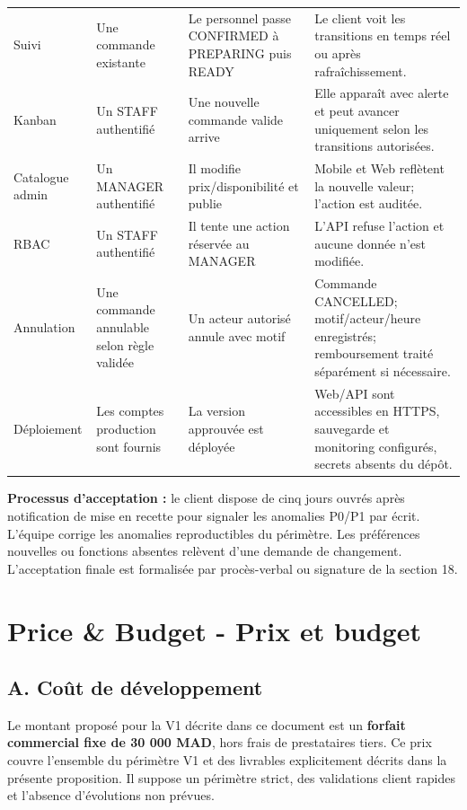 \documentclass[10pt,a4paper]{article}
\begin{document}
\begin{longtable}{@{}L{2.7cm}L{4.1cm}L{4.2cm}L{4.3cm}@{}}
Suivi & Une commande existante & Le personnel passe CONFIRMED à PREPARING puis READY & Le client voit les transitions en temps réel ou après rafraîchissement. \\
Kanban & Un STAFF authentifié & Une nouvelle commande valide arrive & Elle apparaît avec alerte et peut avancer uniquement selon les transitions autorisées. \\
Catalogue admin & Un MANAGER authentifié & Il modifie prix/disponibilité et publie & Mobile et Web reflètent la nouvelle valeur; l'action est auditée. \\
RBAC & Un STAFF authentifié & Il tente une action réservée au MANAGER & L'API refuse l'action et aucune donnée n'est modifiée. \\
Annulation & Une commande annulable selon règle validée & Un acteur autorisé annule avec motif & Commande CANCELLED; motif/acteur/heure enregistrés; remboursement traité séparément si nécessaire. \\
Déploiement & Les comptes production sont fournis & La version approuvée est déployée & Web/API sont accessibles en HTTPS, sauvegarde et monitoring configurés, secrets absents du dépôt. \\
\bottomrule
\end{longtable}

\textbf{Processus d'acceptation :} le client dispose de cinq jours ouvrés après notification de mise en recette pour signaler les anomalies P0/P1 par écrit. L'équipe corrige les anomalies reproductibles du périmètre. Les préférences nouvelles ou fonctions absentes relèvent d'une demande de changement. L'acceptation finale est formalisée par procès-verbal ou signature de la section 18.

\section{Price \& Budget - Prix et budget}
\subsection{A. Coût de développement}
Le montant proposé pour la V1 décrite dans ce document est un \textbf{forfait commercial fixe de 30 000 MAD}, hors frais de prestataires tiers. Ce prix couvre l'ensemble du périmètre V1 et des livrables explicitement décrits dans la présente proposition. Il suppose un périmètre strict, des validations client rapides et l'absence d'évolutions non prévues.
\end{document}
